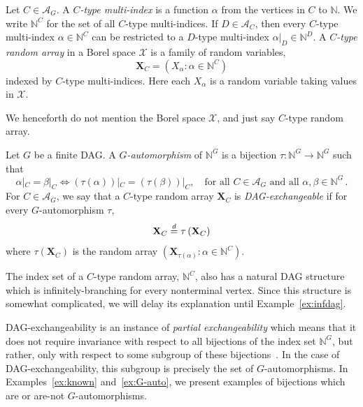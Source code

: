 \documentclass[AHL,Unicode,longabstracts,published]{cedram}
\newcommand{\alf}{\alpha}%
\newcommand*\bb{\beta}
\newcommand{\indices}[1]{\mathbb{N}^{#1}}
\newcommand{\res}[2]{#1|_{#2}}
\renewcommand{\d}{\buildrel{d}\over{=}}
\newcommand*\N{\mathbb{N}}
\renewcommand{\AA}{\mathcal{A}}
\newcommand*\XX{{\mathcal{X}}}
\newcommand*\bX{\mathbf{X}}
\newcommand*\N{\mathbb{N}}
\begin{document}
\begin{defi}\label{def:randomarray}
Let $C\in\AA_G$. A \emph{$C$-type multi-index} is a function $\alf$ from the vertices in $C$ to $\mathbb{N}$. We write $\N^C$ for the set of all $C$-type multi-indices. If $D\in\AA_C$, then every $C$-type multi-index $\alf\in\N^{C}$ can be restricted to a $D$-type multi-index $\alf|_{D}\in \N^{D}$.
A \emph{$C$-type random array} in a Borel space $\XX$ is a family of random variables,
\[
\bX_C = \left(X_{\alf} : \alf \in \indices C\right)
\]
indexed by $C$-type multi-indices. Here each $X_\alf$ is a random variable taking values in $\XX$.
\end{defi}


\begin{rema}
We henceforth do not mention the Borel space $\XX$, and just say $C$-type random array.
\end{rema}

\begin{defi}\label{def: G-auto}
Let $G$ be a finite DAG. A \emph{$G$-automorphism} of $\N^G$ is a bijection $\tau\colon \N^G\to\N^G$ such that
\begin{equation}\label{eqn: automorphism}
\res \alf C = \res \bb C \Longleftrightarrow \res{(\tau(\alf))}C = \res {(\tau (\bb))} C,\quad
\text{for all }C\in\AA_G\text{ and all }\alf,\bb \in \N^G\,.
\end{equation}
For $C\in\AA_G$, we say that a $C$-type random array $\bX_C$ is \emph{DAG-exchangeable} if for every $G$-automorphism $\tau$,
\[
\bX_C\d \tau\left(\bX_C\right)
\]
where $\tau(\bX_C)$ is the random array $\left(\bX_{\tau(\alpha)} : \alpha \in \mathbb{N}^C\right)$.
\end{defi}

\begin{rema}
The index set of a $C$-type random array, $\mathbb{N}^C$, also has a natural DAG structure which is infinitely-branching for every nonterminal vertex. Since this structure is somewhat complicated, we will delay its explanation until Example~\ref{ex:infdag}.
\end{rema}

DAG-exchangeability is an instance of \emph{partial exchangeability} which means that it does not require invariance with respect to all bijections of the index set $\mathbb{N}^G$, but rather, only with respect to some subgroup of these bijections~\cite{aldous1985exchangeability}. In the case of DAG-exchangeability, this subgroup is precisely the set of $G$-automorphisms. In Examples~\ref{ex:known} and~\ref{ex:G-auto}, we present examples of bijections which are or are-not $G$-automorphisms.
\end{document}
